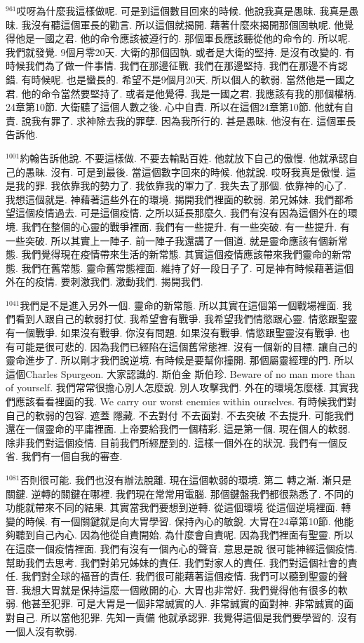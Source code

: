 \documentclass{book}
\begin{document}
$^{961}$哎呀為什麼我這樣做呢.
可是到這個數目回來的時候.
他說我真是愚昧.
我真是愚昧.
我沒有聽這個軍長的勸言.
所以這個就揭開.
藉著什麼來揭開那個固執呢.
他覺得他是一國之君.
他的命令應該被遵行的.
那個軍長應該聽從他的命令的.
所以呢.
我們就發覺.
9個月零20天.
大衛的那個固執.
或者是大衛的堅持.
是沒有改變的.
有時候我們為了做一件事情.
我們在那邊征戰.
我們在那邊堅持.
我們在那邊不肯認錯.
有時候呢.
也是蠻長的.
希望不是9個月20天.
所以個人的軟弱.
當然他是一國之君.
他的命令當然要堅持了.
或者是他覺得.
我是一國之君.
我應該有我的那個權柄.
24章第10節.
大衛聽了這個人數之後.
心中自責.
所以在這個24章第10節.
他就有自責.
說我有罪了.
求神除去我的罪孽.
因為我所行的.
甚是愚昧.
他沒有在.
這個軍長告訴他.

$^{1001}$約翰告訴他說.
不要這樣做.
不要去輸點百姓.
他就放下自己的傲慢.
他就承認自己的愚昧.
沒有.
可是到最後.
當這個數字回來的時候.
他就說.
哎呀我真是傲慢.
這是我的罪.
我依靠我的勢力了.
我依靠我的軍力了.
我失去了那個.
依靠神的心了.
我想這個就是.
神藉著這些外在的環境.
揭開我們裡面的軟弱.
弟兄姊妹.
我們都希望這個疫情過去.
可是這個疫情.
之所以延長那麼久.
我們有沒有因為這個外在的環境.
我們在整個的心靈的戰爭裡面.
我們有一些提升.
有一些突破.
有一些提升.
有一些突破.
所以其實上一陣子.
前一陣子我還講了一個道.
就是靈命應該有個新常態.
我們覺得現在疫情帶來生活的新常態.
其實這個疫情應該帶來我們靈命的新常態.
我們在舊常態.
靈命舊常態裡面.
維持了好一段日子了.
可是神有時候藉著這個外在的疫情.
要刺激我們.
激動我們.
揭開我們.

$^{1041}$我們是不是進入另外一個.
靈命的新常態.
所以其實在這個第一個戰場裡面.
我們看到人跟自己的軟弱打仗.
我希望會有戰爭.
我希望我們情慾跟心靈.
情慾跟聖靈有一個戰爭.
如果沒有戰爭.
你沒有問題.
如果沒有戰爭.
情慾跟聖靈沒有戰爭.
也有可能是很可悲的.
因為我們已經陷在這個舊常態裡.
沒有一個新的目標.
讓自己的靈命進步了.
所以剛才我們說逆境.
有時候是要幫你撞開.
那個屬靈經理的門.
所以這個Charles Spurgeon.
大家認識的.
斯伯金 斯伯珍.
Beware of no man more than of yourself.
我們常常很擔心別人怎麼說.
別人攻擊我們.
外在的環境怎麼樣.
其實我們應該看看裡面的我.
We carry our worst enemies within ourselves.
有時候我們對自己的軟弱的包容.
遮蓋 隱藏.
不去對付 不去面對.
不去突破 不去提升.
可能我們還在一個靈命的平庸裡面.
上帝要給我們一個精彩.
這是第一個.
現在個人的軟弱.
除非我們對這個疫情.
目前我們所經歷到的.
這樣一個外在的狀況.
我們有一個反省.
我們有一個自我的審查.

$^{1081}$否則很可能.
我們也沒有辦法脫離.
現在這個軟弱的環境.
第二 轉之漸.
漸只是關鍵.
逆轉的關鍵在哪裡.
我們現在常常用電腦.
那個鍵盤我們都很熟悉了.
不同的功能就帶來不同的結果.
其實當我們要想到逆轉.
從這個環境 從這個逆境裡面.
轉變的時候.
有一個關鍵就是向大胃學習.
保持內心的敏銳.
大胃在24章第10節.
他能夠聽到自己內心.
因為他從自責開始.
為什麼會自責呢.
因為我們裡面有聖靈.
所以在這麼一個疫情裡面.
我們有沒有一個內心的聲音.
意思是說 很可能神經這個疫情.
幫助我們去思考.
我們對弟兄姊妹的責任.
我們對家人的責任.
我們對這個社會的責任.
我們對全球的福音的責任.
我們很可能藉著這個疫情.
我們可以聽到聖靈的聲音.
我想大胃就是保持這麼一個敞開的心.
大胃也非常好.
我們覺得他有很多的軟弱.
他甚至犯罪.
可是大胃是一個非常誠實的人.
非常誠實的面對神.
非常誠實的面對自己.
所以當他犯罪.
先知一責備 他就承認罪.
我覺得這個是我們要學習的.
沒有一個人沒有軟弱.
\end{document}
